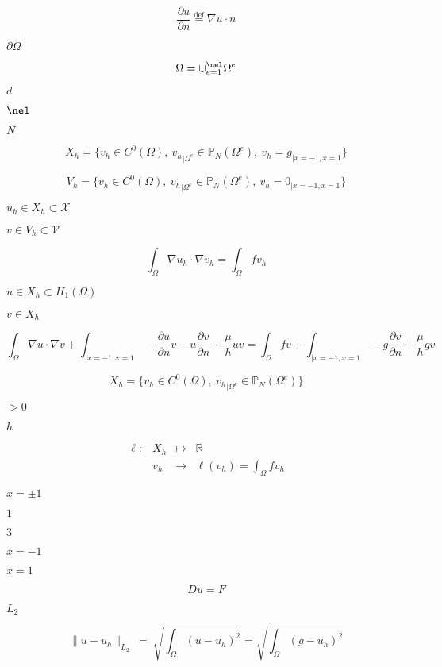 \documentclass{article}
\begin{document}
\[ \label{eq:21} \frac{\partial u}{\partial n} \stackrel{\text{def}}{=} \nabla u \cdot n \]
\pagebreak

$\partial \Omega$
\pagebreak

\[ \label{eq:10} \Omega = \cup_{e=1}^\nel \Omega^e \]
\pagebreak

$d$
\pagebreak

$\nel$
\pagebreak

$N$
\pagebreak

\[ \label{eq:17} X_h = \Big\{ v_h \in C^0(\Omega),\ {v_h}_{|\Omega^e} \in \mathbb{P}_N( \Omega^e ),\ v_h=g_{|x=-1,x=1}\Big\} \]
\pagebreak

\[ \label{eq:18} V_h = \Big\{ v_h \in C^0(\Omega),\ {v_h}_{|\Omega^e} \in \mathbb{P}_N( \Omega^e ),\ v_h=0_{|x=-1,x=1}\Big\} \]
\pagebreak

$u_h \in X_h \subset \mathcal{X}$
\pagebreak

$v \in V_h \subset \mathcal{V}$
\pagebreak

\[ \int_\Omega \nabla u_h \cdot \nabla v_h = \int_\Omega f v_h \]
\pagebreak

$u \in X_h \subset H_1(\Omega)$
\pagebreak

$v \in X_h$
\pagebreak

\[ \int_\Omega \nabla u \cdot \nabla v + \int_{|x=-1,x=1} -\frac{\partial u}{\partial n} v - u \frac{\partial v}{\partial n} + \frac{\mu}{h} u v = \int_\Omega f v + \int_{|x=-1,x=1} - g \frac{\partial v}{\partial n} + \frac{\mu}{h} g v \]
\pagebreak

\[ \label{eq:19} X_h = \Big\{ v_h \in C^0(\Omega),\ {v_h}_{|\Omega^e} \in \mathbb{P}_N( \Omega^e ) \Big\} \]
\pagebreak

$> 0$
\pagebreak

$h$
\pagebreak

\[ \begin{array}{rccl} \ell: & X_h & \mapsto & \mathbb{R}\\ & v_h & \rightarrow &\ell(v_h)=\int_\Omega f v_h \end{array} \]
\pagebreak

$x=\pm 1$
\pagebreak

$1$
\pagebreak

$3$
\pagebreak

$x=-1$
\pagebreak

$x=1$
\pagebreak

\[ D u = F \]
\pagebreak

$L_2$
\pagebreak

\begin{equation} \label{eq:7} \|u-u_h\|_{L_2}\ =\ \sqrt{\int_\Omega (u-u_h)^2} = \sqrt{\int_\Omega (g-u_h)^2} \end{equation}
\pagebreak
\end{document}
